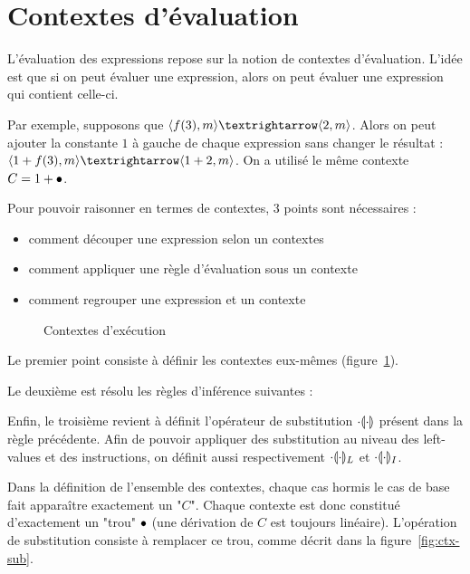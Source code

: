 \section{Contextes d'évaluation}

L'évaluation des expressions repose sur la notion de contextes d'évaluation.
L'idée est que si on peut évaluer une expression, alors on peut évaluer une
expression qui contient celle-ci.

Par exemple, supposons que $\mm{m}{f(3)}{m}{2}$. Alors on peut ajouter la
constante $1$ à gauche de chaque expression sans changer le résultat :
$\mm{m}{1+f(3)}{m}{1+2}$. On a utilisé le même contexte
$C = 1+\ctxEmpty$.

Pour pouvoir raisonner en termes de contextes, 3 points sont nécessaires :

\begin{itemize}
\item comment découper une expression selon un contextes
\item comment appliquer une règle d'évaluation sous un contexte
\item comment regrouper une expression et un contexte
\end{itemize}

\begin{figure}
\figctx{}

\caption{Contextes d'exécution}
\label{fig:eval-ctx}
\end{figure}

Le premier point consiste à définir les contextes eux-mêmes
(figure~\ref{fig:eval-ctx}).

Le deuxième est résolu les règles d'inférence suivantes :

\begin{mathpar}


\end{mathpar}

Enfin, le troisième revient à définit l'opérateur de substitution
$\phxx{\ctxSub}$ présent dans la règle précédente. Afin de pouvoir appliquer des
substitution au niveau des left-values et des instructions, on définit aussi
respectivement $\phxx{\ctxSubL}$ et $\phxx{\ctxSubI}$.

Dans la définition de l'ensemble des contextes, chaque cas hormis le cas de base
fait apparaître exactement un "$C$". Chaque contexte est donc constitué
d'exactement un "trou" $\ctxEmpty$ (une dérivation de $C$ est toujours
linéaire). L'opération de substitution consiste à remplacer ce trou, comme
décrit dans la figure~\ref{fig:ctx-sub}.

